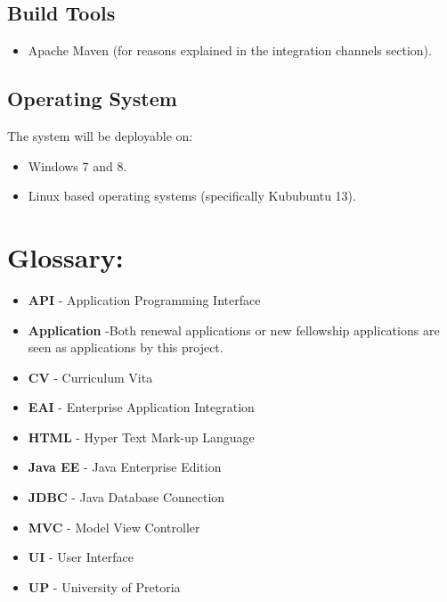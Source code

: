 \documentclass[12pt]{article}
\begin{document}
\subsection*{Build Tools}
\begin{itemize}
\item Apache Maven (for reasons explained in the integration channels section).
\end{itemize}

\subsection*{Operating System}
The system will be deployable on:
\begin{itemize}
\item Windows 7 and 8.
\item Linux based operating systems (specifically Kububuntu 13).
\end{itemize}
\newpage

\section{Glossary:} %
\vspace{0.2in}

\begin{itemize}

\item \textbf{API} - Application Programming Interface
\item \textbf{Application} -Both renewal applications or new fellowship applications are seen as applications by this project.
\item \textbf{CV} - Curriculum Vita
\item \textbf{EAI} - Enterprise Application Integration
\item \textbf{HTML} - Hyper Text Mark-up Language
\item \textbf{Java EE} - Java Enterprise Edition
\item \textbf{JDBC} - Java Database Connection
\item \textbf{MVC} - Model View Controller
\item \textbf{UI} - User Interface
\item \textbf{UP} - University of Pretoria
 
\end{itemize}	
\end{document}
